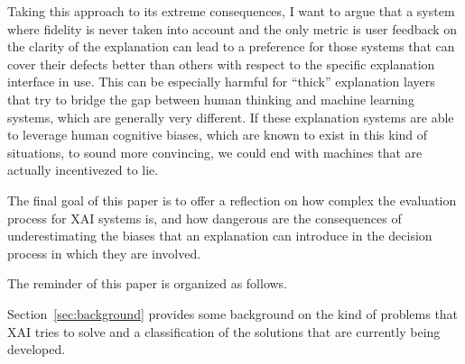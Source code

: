 \documentclass[conference]{IEEEtran}
\newcommand{\cit}[1][]{\todo[tickmarkheight=0.2cm]{cit #1}}
\begin{document}
Taking this approach to its extreme consequences, I want to argue that a system where fidelity is never taken into account and the only metric is user feedback on the clarity of the explanation can lead to a preference for
those systems that can cover their defects better than others with respect to
the specific explanation interface in use. This can be especially harmful for ``thick'' explanation layers that try to bridge the gap between human thinking and machine learning systems, which are generally very different. If these explanation systems are able to leverage human cognitive biases, which are known to exist in this kind of situations, to sound more convincing, we could end with machines that are actually incentivezed to lie.

The final goal of this paper is to offer a reflection on how complex the
evaluation process for XAI systems is, and how dangerous are the consequences of underestimating the biases that an explanation can introduce in the decision process in which they are involved.




The reminder of this paper is organized as follows.

Section~\ref{sec:background} provides some background on the kind of problems that XAI tries to solve and a classification of the solutions that are currently being developed.
\end{document}
